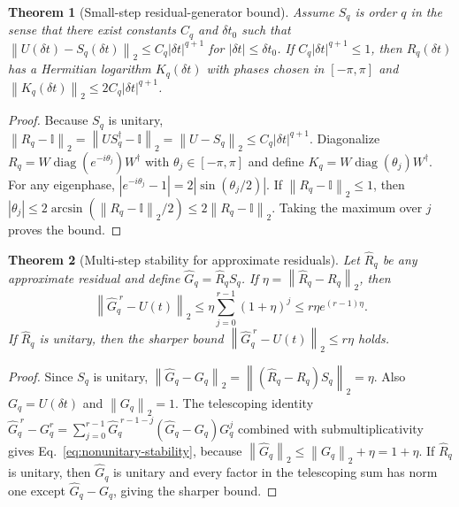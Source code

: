 \documentclass[aps,prresearch,reprint,superscriptaddress,nofootinbib,amsmath,amssymb]{revtex4-2}
\newcommand{\norm}[1]{\left\lVert #1 \right\rVert}
\newcommand{\abs}[1]{\left\lvert #1 \right\rvert}
\newcommand{\id}{\mathbb{I}}
\newcommand{\dt}{\delta t}
\newtheorem{theorem}{Theorem}
\begin{document}
\begin{theorem}[Small-step residual-generator bound]
\label{thm:small-step}
Assume $S_q$ is order $q$ in the sense that there exist constants $C_q$ and $\dt_0$ such that $\norm{U(\dt)-S_q(\dt)}_2\leq C_q\abs{\dt}^{q+1}$ for $\abs{\dt}\leq\dt_0$. If $C_q\abs{\dt}^{q+1}\leq1$, then $R_q(\dt)$ has a Hermitian logarithm $K_q(\dt)$ with phases chosen in $[-\pi,\pi]$ and $\norm{K_q(\dt)}_2\leq 2C_q\abs{\dt}^{q+1}$.
\end{theorem}

\begin{proof}
Because $S_q$ is unitary, $\norm{R_q-\id}_2=\norm{US_q^\dagger-\id}_2=\norm{U-S_q}_2\leq C_q\abs{\dt}^{q+1}$. Diagonalize $R_q=W\operatorname{diag}(e^{-i\theta_j})W^\dagger$ with $\theta_j\in[-\pi,\pi]$ and define $K_q=W\operatorname{diag}(\theta_j)W^\dagger$. For any eigenphase, $\abs{e^{-i\theta_j}-1}=2\abs{\sin(\theta_j/2)}$. If $\norm{R_q-\id}_2\leq1$, then $\abs{\theta_j}\leq2\arcsin(\norm{R_q-\id}_2/2)\leq2\norm{R_q-\id}_2$. Taking the maximum over $j$ proves the bound.
\end{proof}

\begin{theorem}[Multi-step stability for approximate residuals]
\label{thm:residual-stability}
Let $\widehat R_q$ be any approximate residual and define $\widehat G_q=\widehat R_qS_q$. If $\eta=\norm{\widehat R_q-R_q}_2$, then
\begin{equation}
    \norm{\widehat G_q^{\;r}-U(t)}_2
    \leq \eta\sum_{j=0}^{r-1}(1+\eta)^j
    \leq r\eta e^{(r-1)\eta}.
    \label{eq:nonunitary-stability}
\end{equation}
If $\widehat R_q$ is unitary, then the sharper bound $\norm{\widehat G_q^{\;r}-U(t)}_2\leq r\eta$ holds.
\end{theorem}

\begin{proof}
Since $S_q$ is unitary, $\norm{\widehat G_q-G_q}_2=\norm{(\widehat R_q-R_q)S_q}_2=\eta$. Also $G_q=U(\dt)$ and $\norm{G_q}_2=1$. The telescoping identity $\widehat G_q^{\;r}-G_q^r=\sum_{j=0}^{r-1}\widehat G_q^{\;r-1-j}(\widehat G_q-G_q)G_q^j$ combined with submultiplicativity gives Eq.~\eqref{eq:nonunitary-stability}, because $\norm{\widehat G_q}_2\leq\norm{G_q}_2+\eta=1+\eta$. If $\widehat R_q$ is unitary, then $\widehat G_q$ is unitary and every factor in the telescoping sum has norm one except $\widehat G_q-G_q$, giving the sharper bound.
\end{proof}
\end{document}

